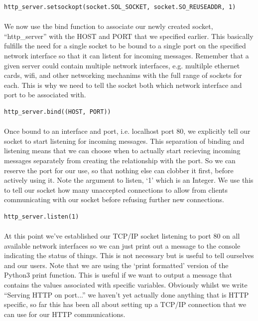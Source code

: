 \begin{lstlisting}[style=CODE]
http_server.setsockopt(socket.SOL_SOCKET, socket.SO_REUSEADDR, 1)
\end{lstlisting}

\paragraph{} We now use the bind function to associate our newly created socket, ``http\_server'' with the HOST and PORT that we specified earlier. This basically fulfills the need for a single socket to be bound to a single port on the specified network interface so that it can listent for incoming messages. Remember that a given server could contain multiple network interfaces, e.g. multilple ethernet cards, wifi, and other networking mechanims with the full range of sockets for each. This is why we need to tell the socket both which network interface and port to be associated with.

\begin{lstlisting}[style=CODE]
http_server.bind((HOST, PORT))
\end{lstlisting}

\paragraph{} Once bound to an interface and port, i.e. localhost port 80, we explicitly tell our socket to start listening for incoming messages. This separation of binding and listening means that we can choose when to actually start recieving incoming messages separately from creating the relationship with the port. So we can reserve the port for our use, so that nothing else can clobber it first, before actively using it. Note the argument to listen, `1' which is an Integer. We use this to tell our socket how many unaccepted connections to allow from clients communicating with our socket before refusing further new connections.

\begin{lstlisting}[style=CODE]
http_server.listen(1)
\end{lstlisting}

\paragraph{} At this point we've established our TCP/IP socket listening to port 80 on all available network interfaces so we can just print out a message to the console indicating the status of things. This is not necessary but is useful to tell ourselves and our users. Note that we are using the `print formatted' version of the Python3 print function. This is useful if we want to output a message that contains the values associated with specific variables. Obviously whilst we write ``Serving HTTP on port...'' we haven't yet actually done anything that is HTTP specific, so far this has been all about setting up a TCP/IP connection that we can use for our HTTP communications.

